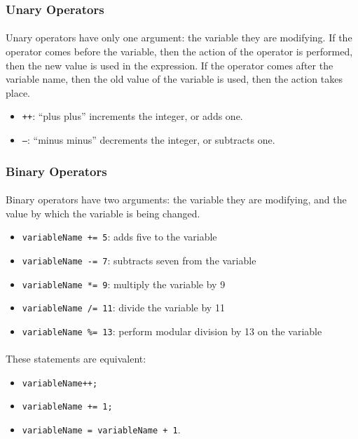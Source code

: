 \documentclass[letter,11pt]{article}
\begin{document}
\subsubsection{Unary Operators}
\paragraph{}Unary operators have only one argument: the variable they are modifying. If the operator comes before the variable, then the action of the operator is performed, then the new value is used in the expression. If the operator comes after the variable name, then the old value of the variable is used, then the action takes place.

\begin{itemize}
    \item \texttt{++}: ``plus plus'' increments the integer, or adds one.
    \item \texttt{--}: ``minus minus'' decrements the integer, or subtracts one.
\end{itemize}

\subsubsection{Binary Operators}
\paragraph{}Binary operators have two arguments: the variable they are modifying, and the value by which the variable is being changed.

\begin{itemize}
    \item \texttt{variableName += 5}: adds five to the variable
    \item \texttt{variableName -= 7}: subtracts seven from the variable
    \item \texttt{variableName *= 9}: multiply the variable by 9
    \item \texttt{variableName /= 11}: divide the variable by 11
    \item \texttt{variableName \%= 13}: perform modular division by 13 on the variable
\end{itemize}

\paragraph{}These statements are equivalent:
\begin{itemize}
    \item \texttt{variableName++;}
    \item \texttt{variableName += 1;}
    \item \texttt{variableName = variableName + 1}.
\end{itemize}
\end{document}
